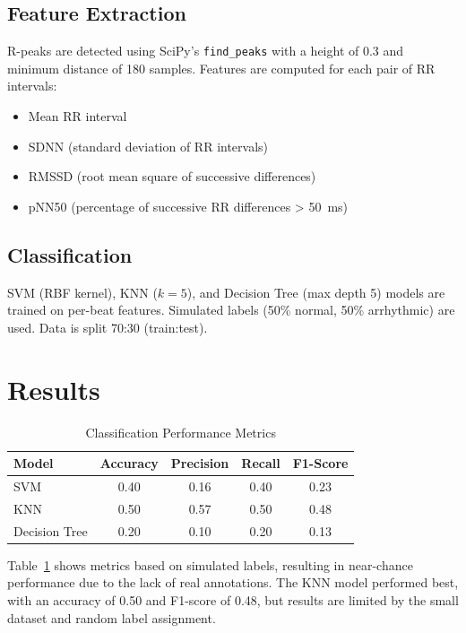\documentclass[a4paper,11pt]{article}
\begin{document}
\subsection{Feature Extraction}
R-peaks are detected using SciPy's \texttt{find\_peaks} with a height of 0.3 and minimum distance of 180 samples. Features are computed for each pair of RR intervals:
\begin{itemize}
    \item Mean RR interval
    \item SDNN (standard deviation of RR intervals)
    \item RMSSD (root mean square of successive differences)
    \item pNN50 (percentage of successive RR differences > \SI{50}{\milli\second})
\end{itemize}

\subsection{Classification}
SVM (RBF kernel), KNN (\( k=5 \)), and Decision Tree (max depth 5) models are trained on per-beat features. Simulated labels (50\% normal, 50\% arrhythmic) are used. Data is split 70:30 (train:test).

\section{Results}
\begin{table}[htbp]
    \centering
    \caption{Classification Performance Metrics}
    \begin{tabular}{lcccc}
        \toprule
        Model & Accuracy & Precision & Recall & F1-Score \\
        \midrule
        SVM & 0.40 & 0.16 & 0.40 & 0.23 \\
        KNN & 0.50 & 0.57 & 0.50 & 0.48 \\
        Decision Tree & 0.20 & 0.10 & 0.20 & 0.13 \\
        \bottomrule
    \end{tabular}
    \label{tab:results}
\end{table}
Table~\ref{tab:results} shows metrics based on simulated labels, resulting in near-chance performance due to the lack of real annotations. The KNN model performed best, with an accuracy of 0.50 and F1-score of 0.48, but results are limited by the small dataset and random label assignment.
\end{document}
